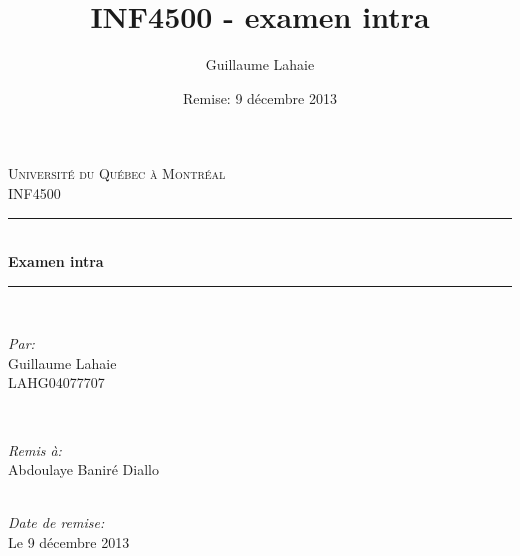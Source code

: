 \documentclass[10.9pt]{article} %
\title{INF4500 - examen intra}
\author{Guillaume Lahaie}
\date{Remise: 9 décembre 2013}
\newcommand\blankpage{%
  \null
  \thispagestyle{empty}%
  \addtocounter{page}{-1}%
  \newpage}
\begin{document}


\begin{titlepage}

\newcommand{\HRule}{\rule{\linewidth}{0.5mm}} %

\center %

\textsc{\LARGE Université du Québec à Montréal}\\[1.5cm] %
\textsc{\Large INF4500}\\[0.5cm] %

\HRule \\[1.5cm]
{ \huge \bfseries Examen intra}\\[0.4cm] %
\HRule \\[1.5cm]

\begin{minipage}{0.4\textwidth}
\begin{flushleft} \large
\emph{Par:}\\
Guillaume Lahaie \\ LAHG04077707 %
\end{flushleft}
\end{minipage}
~
\begin{minipage}{0.4\textwidth}
\begin{flushright} \large
\emph{Remis à:} \\
Abdoulaye Baniré Diallo %
\end{flushright}
\end{minipage}\\[4cm]

{\large \emph{Date de remise:} \\ Le 9 décembre 2013}\\[3cm] %


\vfill %

\end{titlepage}
\blankpage
\end{document}
